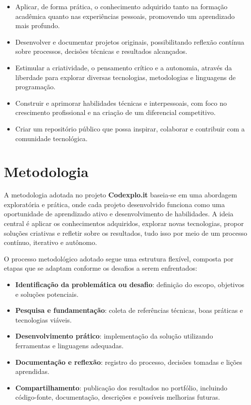 \documentclass[10pt, a4paper, oneside]{article}
\begin{document}
\begin{itemize}
  \item Aplicar, de forma prática, o conhecimento adquirido tanto na formação acadêmica quanto nas experiências pessoais, promovendo um aprendizado mais profundo.
  \item Desenvolver e documentar projetos originais, possibilitando reflexão contínua sobre processos, decisões técnicas e resultados alcançados.
  \item Estimular a criatividade, o pensamento crítico e a autonomia, através da liberdade para explorar diversas tecnologias, metodologias e linguagens de programação.
  \item Construir e aprimorar habilidades técnicas e interpessoais, com foco no crescimento profissional e na criação de um diferencial competitivo.
  \item Criar um repositório público que possa inspirar, colaborar e contribuir com a comunidade tecnológica.\newpage
\end{itemize}




\section{Metodologia}

A metodologia adotada no projeto \textbf{Codexplo.it} baseia-se em uma abordagem exploratória e prática, onde cada projeto desenvolvido funciona como uma oportunidade de aprendizado ativo e desenvolvimento de habilidades. A ideia central é aplicar os conhecimentos adquiridos, explorar novas tecnologias, propor soluções criativas e refletir sobre os resultados, tudo isso por meio de um processo contínuo, iterativo e autônomo.

O processo metodológico adotado segue uma estrutura flexível, composta por etapas que se adaptam conforme os desafios a serem enfrentados:

\begin{itemize}
  \item \textbf{Identificação da problemática ou desafio}: definição do escopo, objetivos e soluções potenciais.
  \item \textbf{Pesquisa e fundamentação}: coleta de referências técnicas, boas práticas e tecnologias viáveis.
  \item \textbf{Desenvolvimento prático}: implementação da solução utilizando ferramentas e linguagens adequadas.
  \item \textbf{Documentação e reflexão}: registro do processo, decisões tomadas e lições aprendidas.
  \item \textbf{Compartilhamento}: publicação dos resultados no portfólio, incluindo código-fonte, documentação, descrições e possíveis melhorias futuras.
\end{itemize}
\end{document}
